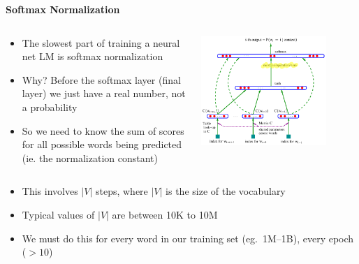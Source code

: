 \documentclass{beamer}
\newcommand{\pagestepalt}[2]{
  \begin{frame}[t]
    \begin{minipage}[t][0.26\textheight][t]{\textwidth}
      \begin{center}
        \huge
        \textbf{#1}
      \end{center}
    \end{minipage}
    
    \begin{minipage}[t][0.7\textheight][c]{\textwidth}
      #2
    \end{minipage}
  \end{frame}
}
\begin{document}
\pagestepalt{Softmax Normalization}{

\begin{minipage}[0.8\textheight]{\textwidth}
\begin{columns}[T]
\begin{column}{0.6\textwidth}
\begin{itemize}
	\item<1-> The slowest part of training a neural net LM is softmax normalization
	\item<2-> Why?  Before the softmax layer (final layer) we just have a real number, not a probability\pause
	\item<3-> So we need to know the sum of scores for all possible words being predicted (ie. the normalization constant)
\end{itemize}
\end{column}
\begin{column}{0.4\textwidth}
\includegraphics[width=0.8\textwidth]{../images/bengio-etal2003_pg6_image_alt2.pdf}
\end{column}
\end{columns}
\end{minipage}

\pause

\hspace*{-2.5em}%
\begin{minipage}{1.0\textwidth}
\begin{itemize}
	\item<4-> This involves $|V|$ steps, where $|V|$ is the size of the vocabulary
	\item<5-> Typical values of $|V|$ are between 10K to 10M
	\item<6-> We must do this for every word in our training set (eg.\ 1M--1B), every epoch ($>10$)
\end{itemize}
\end{minipage}

}
\end{document}
